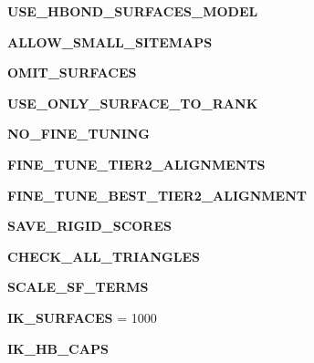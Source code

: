 \begin{CompactItemize}
\item 
\textbf{USE\_\-HBOND\_\-SURFACES\_\-MODEL}\label{classSimSite3D_1_1SearchParameters_0278737369e96b0ca8d7685578a160d5831a2cb95cee561617e96d228eafcedc}

\item 
\textbf{ALLOW\_\-SMALL\_\-SITEMAPS}\label{classSimSite3D_1_1SearchParameters_0278737369e96b0ca8d7685578a160d543f499df35fbe981319f676f9ed14378}

\item 
\textbf{OMIT\_\-SURFACES}\label{classSimSite3D_1_1SearchParameters_0278737369e96b0ca8d7685578a160d5e693337097e34cd00710717ddf730bf8}

\item 
\textbf{USE\_\-ONLY\_\-SURFACE\_\-TO\_\-RANK}\label{classSimSite3D_1_1SearchParameters_0278737369e96b0ca8d7685578a160d53000fed16c2b781a9796124b224878ee}

\item 
\textbf{NO\_\-FINE\_\-TUNING}\label{classSimSite3D_1_1SearchParameters_0278737369e96b0ca8d7685578a160d5411105460cac2fc65d5266f43736c78f}

\item 
\textbf{FINE\_\-TUNE\_\-TIER2\_\-ALIGNMENTS}\label{classSimSite3D_1_1SearchParameters_0278737369e96b0ca8d7685578a160d5ecbffd5cf9076e2f4f2d9c596905b669}

\item 
\textbf{FINE\_\-TUNE\_\-BEST\_\-TIER2\_\-ALIGNMENT}\label{classSimSite3D_1_1SearchParameters_0278737369e96b0ca8d7685578a160d504576ab0c5c8f5dbbba804c2c0274d2a}

\item 
\textbf{SAVE\_\-RIGID\_\-SCORES}\label{classSimSite3D_1_1SearchParameters_0278737369e96b0ca8d7685578a160d544f84bff804eec7f7c39354f9f8ae626}

\item 
\textbf{CHECK\_\-ALL\_\-TRIANGLES}\label{classSimSite3D_1_1SearchParameters_0278737369e96b0ca8d7685578a160d50f64c95335dd96cc5921f4fe06da140f}

\item 
\textbf{SCALE\_\-SF\_\-TERMS}\label{classSimSite3D_1_1SearchParameters_0278737369e96b0ca8d7685578a160d5760e17a2d0988a03d917adef472a93ed}

\item 
\textbf{IK\_\-SURFACES} = 1000\label{classSimSite3D_1_1SearchParameters_c267aed4ea246dc936ccd5b47b71712d64b3f0cd752f91d46f25e27e791c5bf6}

\item 
\textbf{IK\_\-HB\_\-CAPS}\label{classSimSite3D_1_1SearchParameters_c267aed4ea246dc936ccd5b47b71712d439d788290c8a2e8caad1e96753d001b}


\end{CompactItemize}
